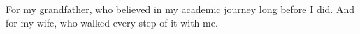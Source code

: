 \begingroup \calligra\huge

For my grandfather, who believed in my academic journey long before I
did. And for my wife, who walked every step of it with me.

\endgroup